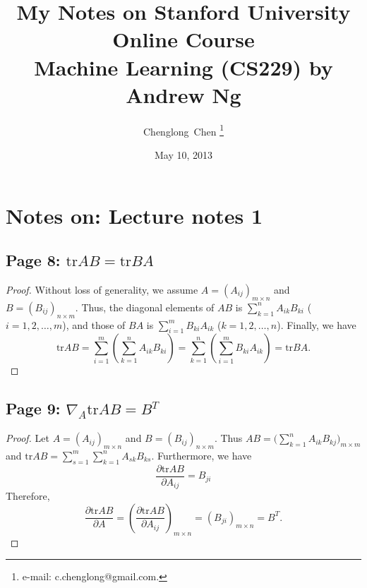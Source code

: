 \documentclass{article}
\begin{document}
\title{My Notes on Stanford University Online Course\\ Machine Learning (CS229) by Andrew Ng}
\author{Chenglong~Chen%
\thanks{e-mail: c.chenglong@gmail.com.}}
\date{May 10, 2013}
\maketitle

\section{Notes on: Lecture notes 1}
\subsection{Page 8: $\text{tr}AB=\text{tr}BA$}
\begin{proof}
Without loss of generality, we assume $A=(A_{ij})_{m\times{n}}$ and $B=(B_{ij})_{n\times{m}}$. Thus, the diagonal elements of $AB$ is $\sum_{k=1}^{n}A_{ik}B_{ki}$ ($i=1,2,\ldots,m$), and those of $BA$ is $\sum_{i=1}^{m}B_{ki}A_{ik}$ ($k=1,2,\ldots,n$). Finally, we have
\[
\text{tr}AB=\sum_{i=1}^{m}\left(\sum_{k=1}^{n}A_{ik}B_{ki}\right)%
=\sum_{k=1}^{n}\left(\sum_{i=1}^{m}B_{ki}A_{ik}\right)=\text{tr}BA.
\]
\end{proof}

\subsection{Page 9: $\nabla_{A}\text{tr}AB=B^T$}
\begin{proof}
Let $A=(A_{ij})_{m\times{n}}$ and $B=(B_{ij})_{n\times{m}}$. Thus $AB=\big(\sum_{k=1}^{n}A_{ik}B_{kj}\big)_{m\times{m}}$ and $\text{tr}AB=\sum_{s=1}^{m}\sum_{k=1}^{n}A_{sk}B_{ks}$. Furthermore, we have
\[
\frac{\partial{\text{tr}AB}}{\partial{A_{ij}}}=B_{ji}
\]
Therefore,
\[
\frac{\partial{\text{tr}AB}}{\partial{A}}=\left(\frac{\partial{\text{tr}AB}}{\partial{A_{ij}}}\right)_{m\times{n}}
=(B_{ji})_{m\times{n}}=B^T.
\]
\end{proof}
\end{document}
